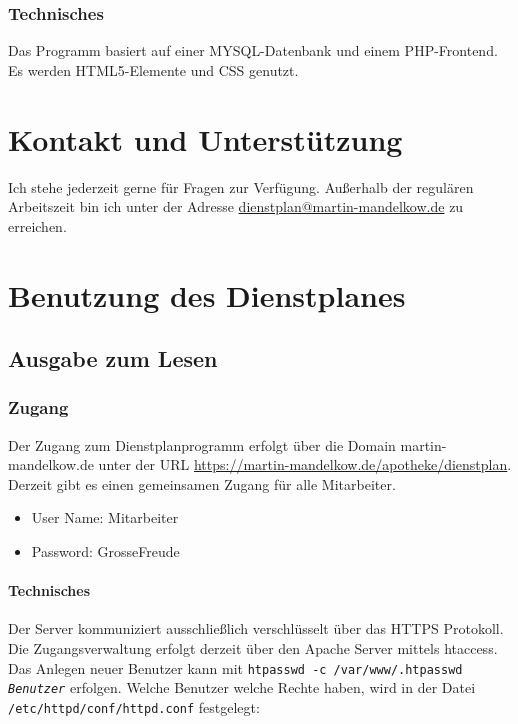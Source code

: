 \documentclass[10pt,a4paper,titlepage,oneside]{article}
\begin{document}
\subsubsection{Technisches}
Das Programm basiert auf einer MYSQL-Datenbank und einem PHP-Frontend.
Es werden HTML5-Elemente und CSS genutzt.










\section{Kontakt und Unterstützung}
Ich stehe jederzeit gerne für Fragen zur Verfügung.
Außerhalb der regulären Arbeitszeit bin ich unter der Adresse \href{mailto:dienstplan@martin-mandelkow.de}{dienstplan@martin-mandelkow.de} zu erreichen.










\section{Benutzung des Dienstplanes}
\subsection{Ausgabe zum Lesen}
\subsubsection{Zugang}
Der Zugang zum Dienstplanprogramm erfolgt über die Domain martin-mandelkow.de unter der URL \url{https://martin-mandelkow.de/apotheke/dienstplan}.
Derzeit gibt es einen gemeinsamen Zugang für alle Mitarbeiter.
\begin{itemize}
	\item User Name: Mitarbeiter
	\item Password: GrosseFreude
\end{itemize}



\paragraph{Technisches}
\begin{sloppypar}Der Server kommuniziert ausschließlich verschlüsselt über das HTTPS Protokoll.
Die Zugangsverwaltung erfolgt derzeit über den Apache Server mittels htaccess.
Das Anlegen neuer Benutzer kann mit \mbox{\texttt{htpasswd -c /var/www/.htpasswd \emph{Benutzer}}}
erfolgen. Welche Benutzer welche Rechte haben, wird in der Datei \mbox{\texttt{/etc/httpd/conf/httpd.conf}} festgelegt:
\end{sloppypar}
\end{document}
